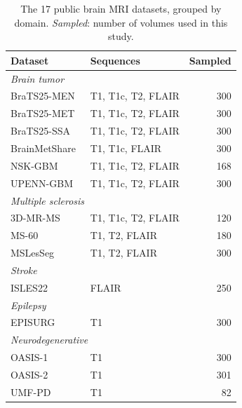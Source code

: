 \documentclass[11pt]{article}
\begin{document}
\begin{table}[t]
\centering
\small
\caption{The 17 public brain MRI datasets, grouped by domain. \emph{Sampled}:
number of volumes used in this study.}
\label{tab:datasets}
\begin{tabular}{llr}
\toprule
\textbf{Dataset} & \textbf{Sequences} & \textbf{Sampled} \\
\midrule
\multicolumn{3}{l}{\textit{Brain tumor}} \\
BraTS25-MEN~\cite{labella_asnr-miccai_2023, labella_analysis_2024, labella_multi-institutional_2024} & T1, T1c, T2, FLAIR & 300 \\
BraTS25-MET~\cite{maleki_analysis_2025}                          & T1, T1c, T2, FLAIR & 300 \\
BraTS25-SSA~\cite{adewole_brain_2023, adewole_brats-africa_2025} & T1, T1c, T2, FLAIR & 300 \\
BrainMetShare~\cite{grovik_brainmetshare_2020}                   & T1, T1c, FLAIR & 300 \\
NSK-GBM~\cite{filimonova_glioblastoma_2026}                       & T1, T1c, T2, FLAIR & 168 \\
UPENN-GBM~\cite{bakas_multi-parametric_2021, bakas_university_2022} & T1, T1c, T2, FLAIR & 300 \\
\midrule
\multicolumn{3}{l}{\textit{Multiple sclerosis}} \\
3D-MR-MS~\cite{lesjak_novel_2018}                                & T1, T1c, T2, FLAIR & 120 \\
MS-60~\cite{ali_m_muslim_brain_2022}                             & T1, T2, FLAIR & 180 \\
MSLesSeg~\cite{guarnera_mslesseg_2025}                           & T1, T2, FLAIR & 300 \\
\midrule
\multicolumn{3}{l}{\textit{Stroke}} \\
ISLES22~\cite{hernandez_petzsche_isles_2022}                     & FLAIR & 250 \\
\midrule
\multicolumn{3}{l}{\textit{Epilepsy}} \\
EPISURG~\cite{perez-garcia_episurg_2020}                         & T1 & 300 \\
\midrule
\multicolumn{3}{l}{\textit{Neurodegenerative}} \\
OASIS-1~\cite{marcus_open_2007}                                  & T1 & 300 \\
OASIS-2~\cite{marcus_open_2010}                                  & T1 & 301 \\
UMF-PD~\cite{badea_exploring_2017}                               & T1 & 82 \\

\end{tabular}
\end{table}
\end{document}
